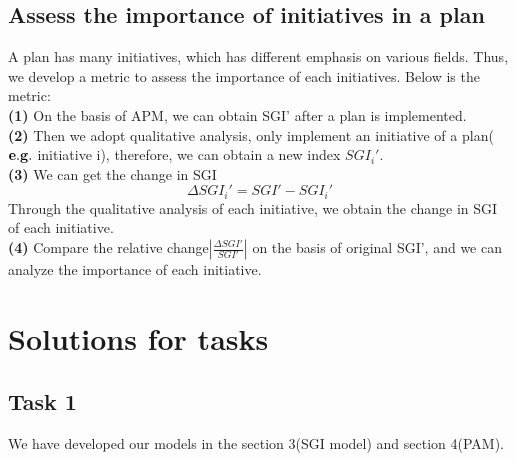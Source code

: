 \documentclass{mcmthesis}
\begin{document}
\subsection{Assess the importance of initiatives in a plan}%
A plan has many initiatives, which has different emphasis on various fields. Thus, we develop a metric to assess the importance of each initiatives. Below is the metric:\\
{\bf (1) } On the basis of APM, we can obtain SGI' after a plan is implemented.\\
{\bf (2) }  Then we adopt qualitative analysis, only implement an initiative of a plan($\bf e.g.$ initiative i), therefore, we can obtain a new index ${SGI_i}'$.\\
{\bf (3) } We can get the change in SGI\\
$$\Delta {SGI_i}'={SGI'}-{SGI_i}'$$
Through the qualitative analysis of each initiative, we obtain the change in SGI of each initiative.\\
{\bf (4) } Compare the relative change$|\frac{\Delta SGI'}{SGI'}|$ on the basis of original SGI', and we can analyze the importance of each initiative. \\

\section{Solutions for tasks }
\subsection{Task 1}%
We have developed our models in the section 3(SGI model) and section 4(PAM).\\
\end{document}
